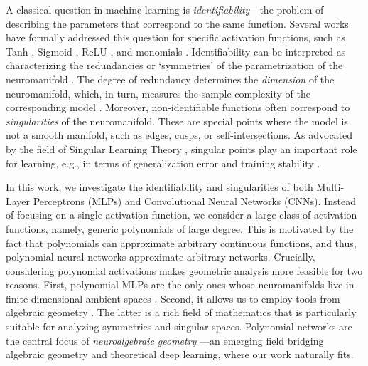 \documentclass{article} %
\theoremstyle{plain}%
\theoremstyle{definition}
\theoremstyle{remark}
\begin{document}
A classical question in machine learning is \emph{identifiability}---the problem of describing the parameters that correspond to the same function. Several works have formally addressed this question for specific activation functions, such as Tanh \citep{fefferman1994reconstructing}, Sigmoid \citep{vlavcic2022neural}, ReLU \citep{grigsby2023hidden, bona2023parameter}, and monomials \citep{finkel2024activation,usevich2025identifiability}.
Identifiability can be interpreted as characterizing the redundancies or `symmetries' of the parametrization of the neuromanifold \citep{lim2024empirical}. The degree of redundancy determines the \emph{dimension} of the neuromanifold, which, in turn, measures the sample complexity of the corresponding model \citep{cucker2002mathematical}. Moreover, non-identifiable functions often correspond to \emph{singularities} of the neuromanifold. These are special points where the model is not a smooth manifold, such as edges, cusps, or self-intersections. %
As advocated by the field of Singular Learning Theory \citep{watanabe2009algebraic}, singular points play an important role for learning, e.g., in terms of generalization error \citep{wei2022deep} and training stability \citep{amari2006singularities,wei2008dynamics}.

In this work, we investigate the identifiability and singularities of both Multi-Layer Perceptrons (MLPs) and Convolutional Neural Networks (CNNs). 
Instead of focusing on a single activation function, we consider a large class of activation functions, namely,  generic polynomials of large degree. 
This is motivated by the fact that polynomials can approximate arbitrary continuous functions, and thus, polynomial neural networks approximate arbitrary networks. 
Crucially, considering polynomial activations makes geometric analysis more feasible for two reasons. 
First, polynomial MLPs are the only ones whose neuromanifolds live in finite-dimensional ambient spaces \cite[Theorem~1]{leshno1993multilayer}. Second, it allows us to employ tools from algebraic geometry \citep{kileel2019expressive, trager2019pure}. The latter is a rich field of mathematics that is particularly suitable for analyzing symmetries and singular spaces. %
Polynomial networks are the central focus of \emph{neuroalgebraic geometry} \citep{marchetti2025invitationneuroalgebraicgeometry}---an emerging field bridging algebraic geometry and theoretical deep learning, where our work naturally fits.  
\end{document}
